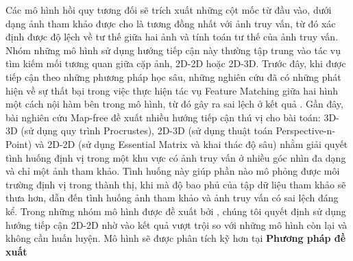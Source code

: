 Các mô hình hồi quy tương đối sẽ trích xuất những cột mốc từ đầu vào, dưới dạng ảnh tham khảo được cho là tương đồng nhất với ảnh truy vấn, từ đó xác định được độ lệch về tư thế giữa hai ảnh và tính toán tư thế của ảnh truy vấn. Nhóm những mô hình sử dụng hướng tiếp cận này thường tập trung vào tác vụ tìm kiếm mối tương quan giữa cặp ảnh, 2D-2D hoặc 2D-3D. Trước đây, khi được tiếp cận theo những phương pháp học sâu, những nghiên cứu đã có những phát hiện về sự thất bại trong việc thực hiện tác vụ Feature Matching giữa hai hình một cách nội hàm bên trong mô hình, từ đó gây ra sai lệch ở kết quả \cite{zhou2020learn}. Gần đây, bài nghiên cứu Map-free \cite{arnold2022mapfree} đề xuất nhiều hướng tiếp cận thú vị cho bài toán: 3D-3D (sử dụng quy trình Procrustes), 2D-3D (sử dụng thuật toán Perspective-n-Point) và 2D-2D (sử dụng Essential Matrix và khai thác độ sâu) nhằm giải quyết tình huống định vị trong một khu vực có ảnh truy vấn ở nhiều góc nhìn đa dạng và chỉ một ảnh tham khảo. Tình huống này giúp phần nào mô phỏng được môi trường định vị trong thành thị, khi mà độ bao phủ của tập dữ liệu tham khảo sẽ thưa hơn, dẫn đến tình huống ảnh tham khảo và ảnh truy vấn có sai lệch đáng kể. Trong những nhóm mô hình được đề xuất bởi \cite{arnold2022mapfree}, chúng tôi quyết định sử dụng hướng tiếp cận 2D-2D nhờ vào kết quả vượt trội so với những mô hình còn lại và không cần huấn luyện. Mô hình sẽ được phân tích kỹ hơn tại \textbf{Phương pháp đề xuất}





